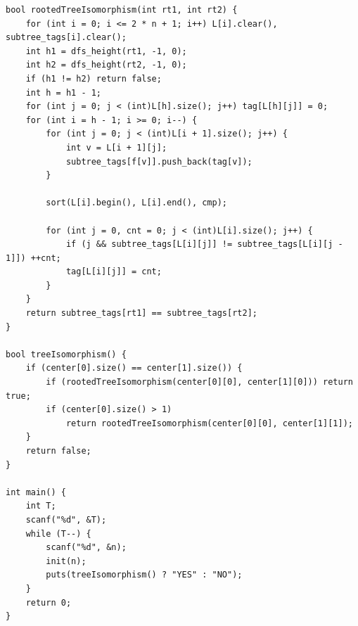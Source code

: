 \documentclass[twoside]{article}
\begin{document}
\begin{lstlisting}
bool rootedTreeIsomorphism(int rt1, int rt2) {
    for (int i = 0; i <= 2 * n + 1; i++) L[i].clear(), subtree_tags[i].clear();
    int h1 = dfs_height(rt1, -1, 0);
    int h2 = dfs_height(rt2, -1, 0);
    if (h1 != h2) return false;
    int h = h1 - 1;
    for (int j = 0; j < (int)L[h].size(); j++) tag[L[h][j]] = 0;
    for (int i = h - 1; i >= 0; i--) {
        for (int j = 0; j < (int)L[i + 1].size(); j++) {
            int v = L[i + 1][j];
            subtree_tags[f[v]].push_back(tag[v]);
        }

        sort(L[i].begin(), L[i].end(), cmp);

        for (int j = 0, cnt = 0; j < (int)L[i].size(); j++) {
            if (j && subtree_tags[L[i][j]] != subtree_tags[L[i][j - 1]]) ++cnt;
            tag[L[i][j]] = cnt;
        }
    }
    return subtree_tags[rt1] == subtree_tags[rt2];
}

bool treeIsomorphism() {
    if (center[0].size() == center[1].size()) {
        if (rootedTreeIsomorphism(center[0][0], center[1][0])) return true;
        if (center[0].size() > 1)
            return rootedTreeIsomorphism(center[0][0], center[1][1]);
    }
    return false;
}

int main() {
    int T;
    scanf("%d", &T);
    while (T--) {
        scanf("%d", &n);
        init(n);
        puts(treeIsomorphism() ? "YES" : "NO");
    }
    return 0;
}\end{lstlisting}
\end{document}
